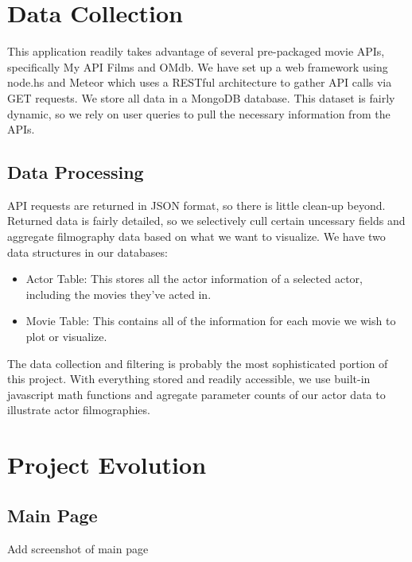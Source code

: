 \documentclass[12pt]{article}
\begin{document}
\newpage 

\section{Data Collection}
	This application readily takes advantage of several pre-packaged movie APIs, specifically My API Films and OMdb. We have set up a web framework using node.hs and Meteor which uses a RESTful architecture to gather API calls via GET requests. We store all data in a MongoDB database. This dataset is fairly dynamic, so we rely on user queries to pull the necessary information from the APIs.
	
\subsection{Data Processing}
	API requests are returned in JSON format, so there is little clean-up beyond. Returned data is fairly detailed, so we selectively cull certain uncessary fields and aggregate filmography data based on what we want to visualize. We have two data structures in our databases:
	
	\begin{itemize}
		\item Actor Table: This stores all the actor information of a selected actor, including the movies they've acted in.
		\item Movie Table: This contains all of the information for each movie we wish to plot or visualize.
	\end{itemize}
	
	The data collection and filtering is probably the most sophisticated portion of this project. With everything stored and readily accessible, we use built-in javascript math functions and agregate parameter counts of our actor data to illustrate actor filmographies.

\newpage 

\section{Project Evolution}

\subsection{Main Page}

	\begin{center}
	Add screenshot of main page
	\end{center}
\end{document}
